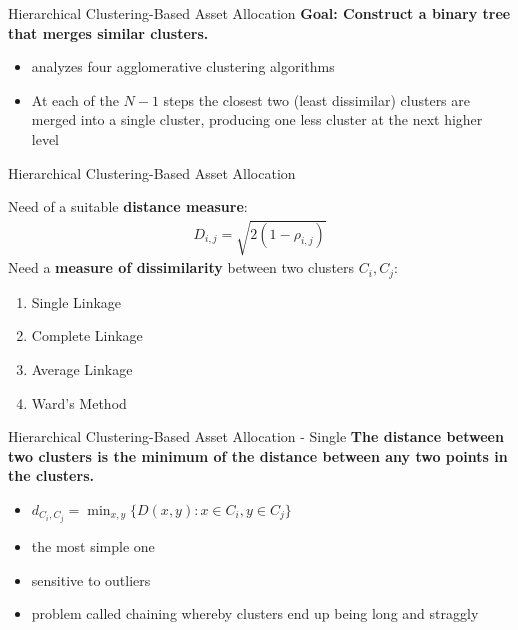 \begin{frame}{Hierarchical Clustering-Based Asset Allocation}
\textbf{Goal: Construct a binary tree that merges similar clusters.}
    \begin{itemize}
        \item \citet{raffinot2017hierarchical} analyzes four agglomerative clustering algorithms
        \item At each of the $N-1$ steps the closest two (least dissimilar) clusters are merged into a single cluster, producing one less cluster at the next higher level
    \end{itemize}

\end{frame}

\begin{frame}{Hierarchical Clustering-Based Asset Allocation}
    
         Need of a suitable \textbf{distance measure}:
        \begin{align*}
            D_{i,j}=\sqrt{2(1-\rho_{i,j})}
        \end{align*}
        Need a \textbf{measure of dissimilarity} between two clusters $C_i,C_j$:
        \begin{enumerate}
            \item Single Linkage
            \item Complete Linkage
            \item Average Linkage
            \item Ward’s Method
        \end{enumerate}
   

\end{frame}


\begin{frame}{Hierarchical Clustering-Based Asset Allocation - Single}
\textbf{The distance between two clusters is the minimum of the distance between any two points in the clusters.}
    \begin{itemize}
        \item $d_{C_i,C_j}=\min_{x,y}\{D(x,y): x\in C_i, y\in C_j\}$
        \item the most simple one
        \item sensitive to outliers
        \item problem called chaining whereby clusters end up being long and straggly
    \end{itemize}
\end{frame}

